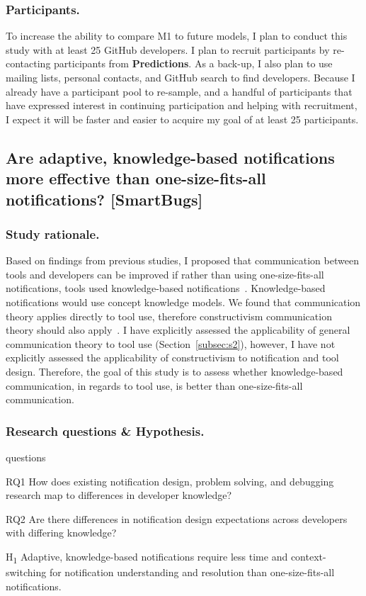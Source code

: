 \documentclass{llncs}
\begin{document}
\subsubsection{Participants.} To increase the ability to compare M1 to future models, I plan to conduct this study with at least 25 GitHub developers. I plan to recruit participants by re-contacting participants from \textbf{Predictions}. As a back-up, I also plan to use mailing lists, personal contacts, and GitHub search to find developers. Because I already have a participant pool to re-sample, and a handful of participants that have expressed interest in continuing participation and helping with recruitment, I expect it will be faster and easier to acquire my goal of at least 25 participants.

\subsection{Are adaptive, knowledge-based notifications more effective than one-size-fits-all notifications? [SmartBugs]} \label{subsec:s5}
\subsubsection{Study rationale.}
Based on findings from previous studies, I proposed that communication between tools and developers can be improved if rather than using one-size-fits-all notifications, tools used knowledge-based notifications~\cite{johnson2015bespoke}. Knowledge-based notifications would use concept knowledge models. We found that communication theory applies directly to tool use, therefore constructivism communication theory should also apply~\cite{griffin2011first}. 
I have explicitly assessed the applicability of general communication theory to tool use (Section~\ref{subsec:s2}), however, I have not explicitly assessed the applicability of constructivism to notification and tool design. Therefore, the goal of this study is to assess whether knowledge-based communication, in regards to tool use, is better than one-size-fits-all communication.

\subsubsection{Research questions \& Hypothesis.}

\begin{labeling}{questions}
	\item [RQ1] How does existing notification design, problem solving, and debugging research map to differences in developer knowledge?
	\item [RQ2] Are there differences in notification design expectations across developers with differing knowledge?
	\item [H\textsubscript{1}] Adaptive, knowledge-based notifications require less time and context-switching for notification understanding and resolution than one-size-fits-all notifications.
\end{labeling}
\end{document}
